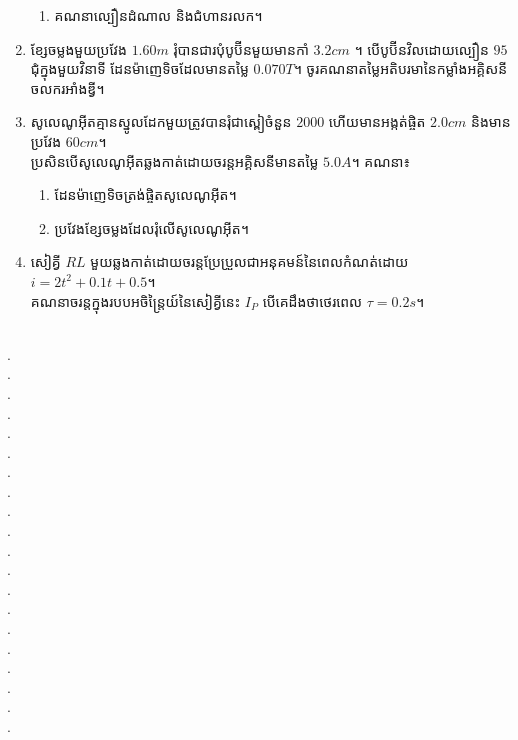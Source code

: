 \documentclass{officialexam}
\begin{document}
\begin{enumerate}[I]
\begin{enumerate}[k,2]
		\item គណនាល្បឿនដំណាល និងជំហានរលក។
	\end{enumerate}
	\item ខ្សែចម្លងមួយប្រវែង $1.60m$ រុំបានជារបុំបូប៊ីនមួយមានកាំ $3.2cm$ ។ បើបូប៊ីនវិលដោយល្បឿន $95$ ជុំក្នុងមួយវិនាទី ដែនម៉ាញេទិចដែលមានតម្លៃ $0.070T$។ ចូរគណនាតម្លៃអតិបរមានៃកម្លាំងអគ្គិសនីចលករអាំងឌ្វី។
	\item សូលេណូអុីតគ្មានស្នូលដែកមួយត្រូវបានរុំជាស្ពៀចំនួន $2000$ ហើយមានអង្កត់ផ្ចិត $2.0cm$ និងមានប្រវែង $60cm$។\\ ប្រសិនបើសូលេណូអុីតឆ្លងកាត់ដោយចរន្តអគ្គិសនីមានតម្លៃ $5.0A$។ គណនា៖
	\begin{enumerate}[k,2]
		\item ដែនម៉ាញេទិចត្រង់ផ្ចិតសូលេណូអុីត។
		\item ប្រវែងខ្សែចម្លងដែលរុំលើសូលេណូអុីត។
	\end{enumerate}
	\item សៀគ្វី $RL$ មួយឆ្លងកាត់ដោយចរន្តប្រែប្រួលជាអនុគមន៍នៃពេលកំណត់ដោយ $i=2t^2+0.1t+0.5$។ \\គណនាចរន្តក្នុងរបបអចិ​​ន្រ្តៃយ៍នៃសៀគ្វីនេះ $I_P$ បើគេដឹងថាថេរពេល $\tau=0.2s$។
\end{enumerate}
\\
{\color{white}.}\dotfill\\
{\color{white}.}\dotfill\\
{\color{white}.}\dotfill
\\
{\color{white}.}\dotfill\\
{\color{white}.}\dotfill\\
{\color{white}.}\dotfill
\\
{\color{white}.}\dotfill\\
{\color{white}.}\dotfill\\
{\color{white}.}\dotfill
\\
{\color{white}.}\dotfill\\
{\color{white}.}\dotfill\\
{\color{white}.}\dotfill
\\
{\color{white}.}\dotfill\\
{\color{white}.}\dotfill\\
{\color{white}.}\dotfill
\\
{\color{white}.}\dotfill\\
{\color{white}.}\dotfill\\
{\color{white}.}\dotfill
\\
{\color{white}.}\dotfill\\
{\color{white}.}\dotfill\\
\end{document}
